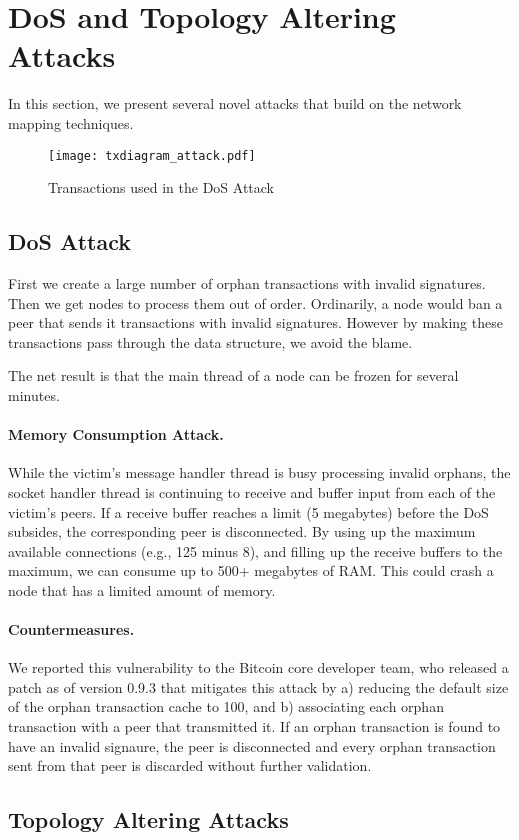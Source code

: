 \section{DoS and Topology Altering Attacks}

In this section, we present several novel attacks that build on the network mapping techniques.

\begin{figure}
\centering
\label{fig:attack}
\texttt{[image: txdiagram\_attack.pdf]}
\caption{Transactions used in the  DoS Attack}
\end{figure}

\subsection{ DoS Attack}

First we create a large number of orphan transactions with invalid signatures. Then we get nodes to process them out of order. Ordinarily, a node would ban a peer that sends it transactions with invalid signatures. However by making these transactions pass through the  data structure, we avoid the blame.

The net result is that the main thread of a node can be frozen for several minutes.

\paragraph{Memory Consumption Attack.}

While the victim's  message handler thread is busy processing invalid orphans, the socket handler thread is continuing to receive and buffer input from each of the victim's peers. If a receive buffer reaches a limit (5 megabytes) before the  DoS subsides, the corresponding peer is disconnected. By using up the maximum available connections (e.g., 125 minus 8), and filling up the receive buffers to the maximum, we can consume up to 500+ megabytes of RAM. This could crash a node that has a limited amount of memory.

\paragraph{Countermeasures.}
We reported this vulnerability to the Bitcoin core developer team, who released a patch as of version 0.9.3 that mitigates this attack by a) reducing the default size of the orphan transaction cache to 100, and b) associating each orphan transaction with a peer that transmitted it. If an orphan transaction is found to have an invalid signaure, the peer is disconnected and every orphan transaction sent from that peer is discarded without further validation.

\subsection{Topology Altering Attacks}

